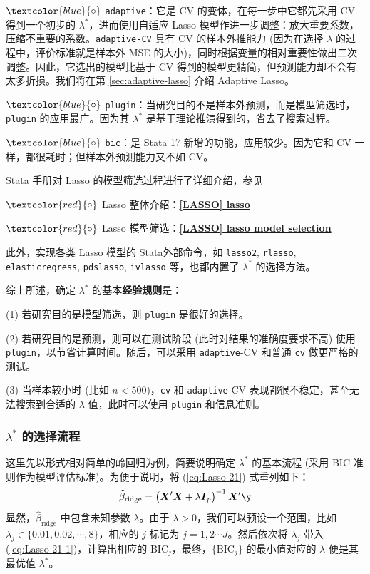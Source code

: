 $\textcolor{blue}{\circ}$ \texttt{adaptive}：它是 $\mathrm{CV}$ 的变体，在每一步中它都先采用 CV 得到一个初步的 $\lambda^{*}$，进而使用自适应 Lasso 模型作进一步调整：放大重要系数，压缩不重要的系数。\texttt{adaptive-CV} 具有 CV 的样本外推能力 (因为在选择 $\lambda$ 的过程中，评价标准就是样本外 MSE 的大小)，同时根据变量的相对重要性做出二次调整。因此，它选出的模型比基于 CV 得到的模型更精简，但预测能力却不会有太多折损。我们将在第 \ref{sec:adaptive-lasso} 介绍 Adaptive Lasso。

$\textcolor{blue}{\circ}$ \texttt{plugin}：当研究目的不是样本外预测，而是模型筛选时，\texttt{plugin} 的应用最广。因为其 $\lambda^*$ 是基于理论推演得到的，省去了搜索过程。

$\textcolor{blue}{\circ}$ \texttt{bic}：是 Stata 17 新增的功能，应用较少。因为它和 CV 一样，都很耗时；但样本外预测能力又不如 CV。

Stata 手册对 Lasso 的模型筛选过程进行了详细介绍，参见 

$\textcolor{red}{\circ}$ Lasso 整体介绍：\href{https://www.stata.com/manuals/lassolasso.pdf}{\bfseries{[\MakeUppercase{lasso}] lasso}}

$\textcolor{red}{\circ}$ Lasso 模型筛选：\href{https://www.stata.com/manuals/lassolasso.pdf}{\bfseries{[\MakeUppercase{lasso}] lasso model selection}}

此外，实现各类 Lasso 模型的 Stata外部命令，如 \texttt{lasso2}, \texttt{rlasso}, \texttt{elasticregress}, \texttt{pdslasso}, \texttt{ivlasso} 等，也都内置了 $\lambda^*$ 的选择方法。 

\vspace{5pt}
综上所述，确定 $\lambda^{*}$ 的基本\textbf{经验规则}是：
\vspace{5pt}

(1) 若研究目的是模型筛选，则 \texttt{plugin} 是很好的选择。

(2) 若研究目的是预测，则可以在测试阶段 (此时对结果的准确度要求不高) 使用 \texttt{plugin}，以节省计算时间。随后，可以采用 \texttt{adaptive}-CV 和普通 \texttt{cv} 做更严格的测试。

(3) 当样本较小时 (比如 $n<500$)，\texttt{cv} 和 \texttt{adaptive}-CV 表现都很不稳定，甚至无法搜索到合适的 $\lambda$ 值，此时可以使用 \texttt{plugin} 和信息准则。

\subsubsection{$\lambda^*$ 的选择流程}

这里先以形式相对简单的岭回归为例，简要说明确定  $\lambda^*$ 的基本流程 (采用 BIC 准则作为模型评估标准)。为便于说明，将
(\ref{eq:Lasso-21}) 式重列如下：
\begin{equation}\label{eq:Lasso-21-1}
	\widehat{\beta}_{\text {ridge}} =\left(\boldsymbol{X}^{\prime} \boldsymbol{X}+\lambda \boldsymbol{I}_{p}\right)^{-1} \boldsymbol{X}^{\prime} \boldsymbol{\y}
\end{equation}
显然，$\widehat{\beta}_{\text {ridge}}$ 中包含未知参数 $\lambda$。由于 $\lambda>0$，我们可以预设一个范围，比如 $\lambda_j \in \{0.01, 0.02, \cdots, 8\}$，相应的 $j$ 标记为 $j=1,2\cdots J$。然后依次将 $\lambda_j$ 带入 (\ref{eq:Lasso-21-1})，计算出相应的 BIC$_j$，最终，$\{\mathrm{BIC}_j\}$ 的最小值对应的 $\lambda$ 便是其最优值 $\lambda^*$。

